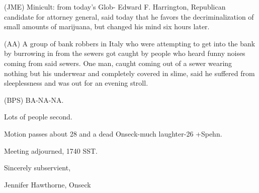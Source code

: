\documentclass[12pt]{article}
\begin{document}
(JME) Minicult: from today's Glob- Edward F. Harrington, Republican candidate for attorney general, said today that he favors the decriminalization of small amounts of marijuana, but changed his mind six hours later.

(AA) A group of bank robbers in Italy who were attempting to get into the bank by burrowing in from the sewers got caught by people who heard funny noises coming from said sewers. One man, caught coming out of a sewer wearing nothing but his underwear and completely covered in slime, said he suffered from sleeplessness and was out for an evening stroll.

(BPS) BA-NA-NA.

Lots of people second.

Motion passes about 28 and a dead Onseck-much laughter-26 +Spehn.

\vspace{12pt}

\noindent
Meeting adjourned, 1740 SST.

\vspace{18pt}

\centerline{Sincerely subservient,}
\centerline{Jennifer Hawthorne, Onseck}
\end{document}
